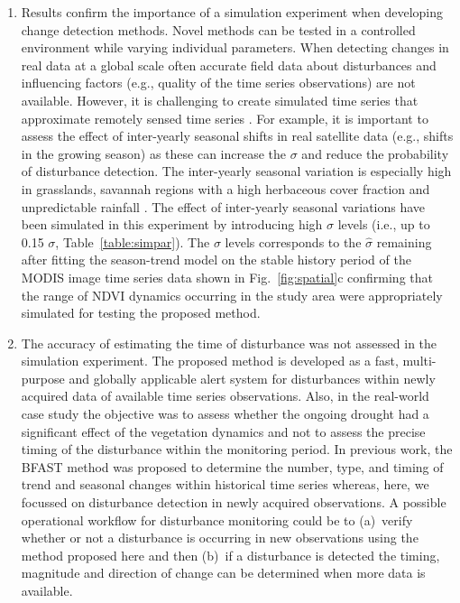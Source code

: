 \documentclass[authoryear,preprint,review,10pt]{elsarticle}
\begin{document}
\begin{enumerate}[(1)]
\item Results confirm the importance of a simulation experiment when developing change detection methods. Novel methods can be tested in a controlled environment while varying individual parameters. When detecting changes in real data at a global scale often accurate field data about disturbances and influencing factors (e.g., quality of the time series observations) are not available. However, it is challenging to create simulated time series that approximate remotely sensed time series \citep{Zhang2009}. For example, it is important to assess the effect of inter-yearly seasonal shifts in real satellite data (e.g., shifts in the growing season) as these can increase the $\sigma$ and reduce the probability of disturbance detection. The inter-yearly seasonal variation is especially high in grasslands, savannah regions with a high herbaceous cover fraction and unpredictable rainfall \citep{deJong:wo}. The effect of inter-yearly seasonal variations have been simulated in this experiment by introducing high $\sigma$ levels (i.e., up to 0.15 $\sigma$, Table~\ref{table:simpar}). The $\sigma$ levels corresponds to the $\hat\sigma$ remaining after fitting the season-trend model on the stable history period of the MODIS image time series data shown in Fig.~\ref{fig:spatial}c confirming that the range of NDVI dynamics occurring in the study area were appropriately simulated for testing the proposed method.


\item The accuracy of estimating the time of disturbance was not assessed in the simulation experiment. The proposed method is developed as a fast, multi-purpose and globally applicable alert system for disturbances within newly acquired data of available time series observations. Also, in the real-world case study the objective was to assess whether the ongoing drought had a significant effect of the vegetation dynamics and not to assess the precise timing of the disturbance within the monitoring period.
In previous work, the BFAST method was proposed to determine the number, type, and timing of trend and seasonal changes within historical time series \citep{Verbesselt2009a} whereas, here, we focussed on disturbance detection in newly acquired observations. A possible operational workflow for disturbance monitoring could be to (a)~verify whether or not a disturbance is occurring in new observations using the method proposed here and then (b)~if a disturbance is detected the timing, magnitude and direction of change can be determined when more data is available.  


\end{enumerate}
\end{document}
